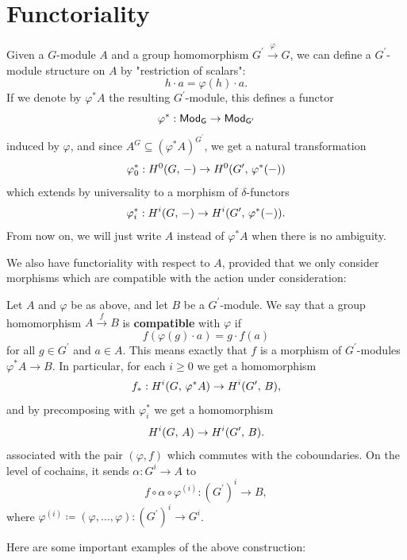 \documentclass[a4paper, oneside]{memoir}
\begin{document}
\section{Functoriality}

Given a $G$-module $A$ and a group homomorphism $ G^{\prime} \overset{\varphi}{\to} G$, we can define a $G^{\prime} $-module structure on $A$ by "restriction of scalars":
\[
    h\cdot a = \varphi(h)\cdot a.
\]
If we denote by $\varphi^* A$ the resulting $G^{\prime} $-module, this defines a functor
\[
    \varphi^* : \mathsf{Mod}_\mathsf{G}\to \mathsf{Mod}_\mathsf{G^\prime}
\]
induced by $\varphi$, and since $A^G\subseteq (\varphi^*A)^{G^{\prime}} $, we get a natural transformation
\[
    \varphi_0^*: H^{0}( G, \, - )\to H^{0}( G^{\prime} , \, \varphi^*(-) )
\]
which extends by universality to a morphism of $\delta$-functors
\[
    \varphi_i^*: H^{i}( G, \, - )\to H^{i}( G^{\prime} , \, \varphi^*(-) )
    .\]
From now on, we will just write $A$ instead of $\varphi^*A$ when there is no ambiguity.

We also have functoriality with respect to $A$, provided that we only consider morphisms which are compatible with the action under consideration:

\begin{definition}
    Let $A$ and $\varphi$ be as above, and let $B$ be a $G^{\prime} $-module. We say that a group homomorphism $A\overset{f}{\to} B$ is \textbf{compatible} with $\varphi$ if
    \[
        f(\varphi(g)\cdot a)=g\cdot f(a)
    \]
    for all $g\in G^{\prime} $ and $a\in A$. This means exactly that $f$ is a morphism of $G^{\prime} $-modules $\varphi^*A\to B$. In particular, for each $i\geq 0$ we get a homomorphism
    \[
        f_*: H^{i}( G, \, \varphi^*A )\to H^{i}( G^{\prime} , \, B ),
    \]
    and by precomposing with $\varphi_i^*$ we get a homomorphism
    \[
        H^{i}( G, \, A )\to H^{i}( G^{\prime} , \, B ).
    \]
    associated with the pair $(\varphi,f)$ which commutes with the coboundaries.
    On the level of cochains, it sends $\alpha: G^i\to A$ to
    \begin{equation*}\label{eq:Explicit} f \circ \alpha \circ \varphi^{(i)}: {(G^{\prime})}^i\to B, \end{equation*}
    where \(\varphi^{(i)} \coloneqq (\varphi, \dots ,\varphi): {(G^{\prime})}^i\to G^i \).
\end{definition}

Here are some important examples of the above construction:
\end{document}

